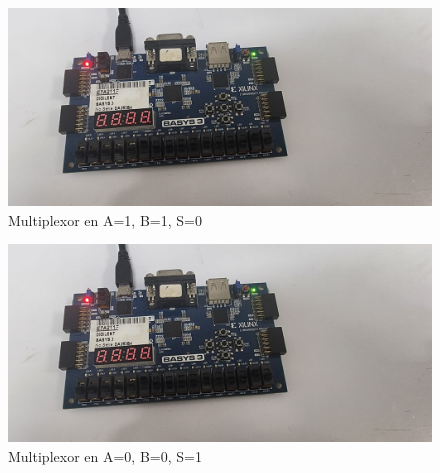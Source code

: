 \documentclass[12pt]{article}  %
\begin{document}
\begin{figure}[!ht]
    \centering
    \caption{Multiplexor en A=1, B=1, S=0}
    \includegraphics[width=1\linewidth]{simulations/multiplex/multiplex1.jpg}
\end{figure}
\begin{figure}[!ht]
    \centering
    \caption{Multiplexor en A=0, B=0, S=1}
    \includegraphics[width=1\linewidth]{simulations/multiplex/multiplex1.jpg}
\end{figure}
\newpage
\end{document}
